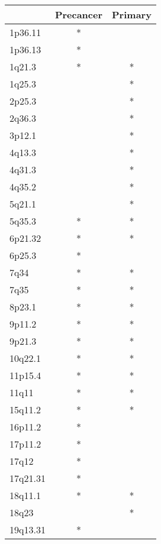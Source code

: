 \begin{tabular}{lcc}
\toprule
{} & Precancer & Primary \\
\midrule
1p36.11  &         * &         \\
1p36.13  &         * &         \\
1q21.3   &         * &       * \\
1q25.3   &           &       * \\
2p25.3   &           &       * \\
2q36.3   &           &       * \\
3p12.1   &           &       * \\
4q13.3   &           &       * \\
4q31.3   &           &       * \\
4q35.2   &           &       * \\
5q21.1   &           &       * \\
5q35.3   &         * &       * \\
6p21.32  &         * &       * \\
6p25.3   &         * &         \\
7q34     &         * &       * \\
7q35     &         * &       * \\
8p23.1   &         * &       * \\
9p11.2   &         * &       * \\
9p21.3   &         * &       * \\
10q22.1  &         * &       * \\
11p15.4  &         * &       * \\
11q11    &         * &       * \\
15q11.2  &         * &       * \\
16p11.2  &         * &         \\
17p11.2  &         * &         \\
17q12    &         * &         \\
17q21.31 &         * &         \\
18q11.1  &         * &       * \\
18q23    &           &       * \\
19q13.31 &         * &         \\
\bottomrule
\end{tabular}
